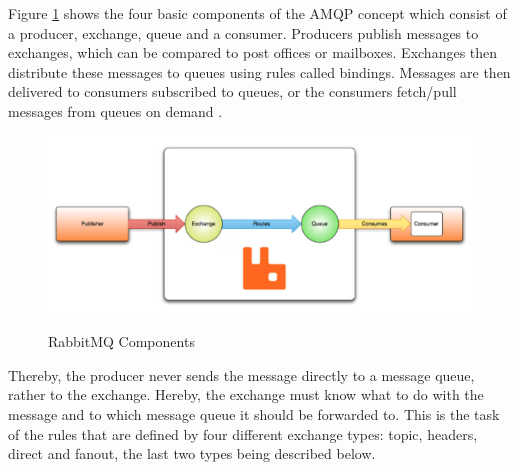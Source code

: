 Figure \ref{fig:rabbit_mq} shows the four basic components of the \ac{AMQP} concept which consist of a producer, exchange, queue and a consumer. Producers publish messages to exchanges, which can be compared to post offices or mailboxes. Exchanges then distribute these messages to queues using rules called bindings. Messages are then delivered to consumers subscribed to queues, or the consumers fetch/pull messages from queues on demand \cite{amqp-concepts}.
\begin{figure}[htb]
  \centering
  \includegraphics[scale=0.6]{rabbit_mq.png}\\
  \caption{RabbitMQ Components}
  \label{fig:rabbit_mq}
  \protect\cite{amqp-concepts}
\end{figure}

Thereby, the producer never sends the message directly to a message queue, rather to the exchange. Hereby, the exchange must know what to do with the message and to which message queue it should be forwarded to. This is the task of the rules that are defined by four different exchange types:  topic, headers, direct and fanout, the last two types being described below.

